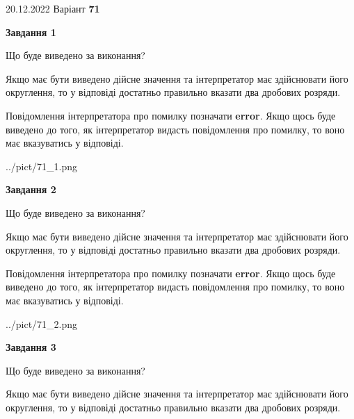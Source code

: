 \documentclass[12pt, ukrainian]{article}
\begin{document}
{20.12.2022 Варіант \No \textbf { 71 }\par}
{
\begin {Large}

{\begin {center}\textbf{Завдання 1}\end {center}}\par
Що буде виведено за виконання? \par

Якщо має бути виведено дійсне значення та інтерпретатор має здійснювати його округлення, 
то у відповіді достатньо правильно вказати два дробових розряди.

Повідомлення інтерпретатора про помилку позначати \textbf{error}.
Якщо щось буде виведено до того, як інтерпретатор видасть повідомлення про помилку, 
то воно має вказуватись у відповіді. \par

\begin{center}
	{../pict/71_1.png}
\end{center}
\newpage

{\begin {center}\textbf{Завдання 2}\end {center}}\par
Що буде виведено за виконання? \par

Якщо має бути виведено дійсне значення та інтерпретатор має здійснювати його округлення, 
то у відповіді достатньо правильно вказати два дробових розряди.

Повідомлення інтерпретатора про помилку позначати \textbf{error}.
Якщо щось буде виведено до того, як інтерпретатор видасть повідомлення про помилку, 
то воно має вказуватись у відповіді. \par

\begin{center}
	{../pict/71_2.png}
\end{center}
\newpage

{\begin {center}\textbf{Завдання 3}\end {center}}\par
Що буде виведено за виконання? \par

Якщо має бути виведено дійсне значення та інтерпретатор має здійснювати його округлення, 
то у відповіді достатньо правильно вказати два дробових розряди.


\end{Large}}
\end{document}

